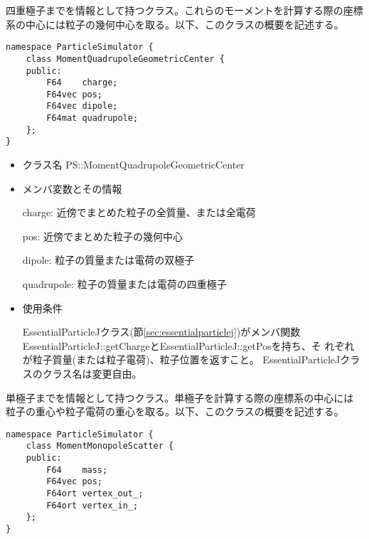 \label{sec:MomentQuadrupoleGeometricCenter}

四重極子までを情報として持つクラス。これらのモーメントを計算する際の座標
系の中心には粒子の幾何中心を取る。以下、このクラスの概要を記述する。
\begin{screen}
\begin{verbatim}
namespace ParticleSimulator {
    class MomentQuadrupoleGeometricCenter {
    public:
        F64    charge;    
        F64vec pos;
        F64vec dipole;
        F64mat quadrupole;
    };
}
\end{verbatim}
\end{screen}

\begin{itemize}
\item クラス名
  PS::MomentQuadrupoleGeometricCenter

\item メンバ変数とその情報

  charge: 近傍でまとめた粒子の全質量、または全電荷

  pos: 近傍でまとめた粒子の幾何中心

  dipole: 粒子の質量または電荷の双極子

  quadrupole: 粒子の質量または電荷の四重極子

\item 使用条件

  EssentialParticleJクラス(節\ref{sec:essentialparticlej})がメンバ関数
  EssentialParticleJ::getChargeとEssentialParticleJ::getPosを持ち、そ
  れぞれが粒子質量(または粒子電荷)、粒子位置を返すこと。
  EssentialParticleJクラスのクラス名は変更自由。

\end{itemize}


\label{sec:MomentMonopoleScatter}

単極子までを情報として持つクラス。単極子を計算する際の座標系の中心には
粒子の重心や粒子電荷の重心を取る。以下、このクラスの概要を記述する。
\begin{screen}
\begin{verbatim}
namespace ParticleSimulator {
    class MomentMonopoleScatter {
    public:
        F64    mass;
        F64vec pos;
        F64ort vertex_out_;
        F64ort vertex_in_;
    };
}
\end{verbatim}
\end{screen}


